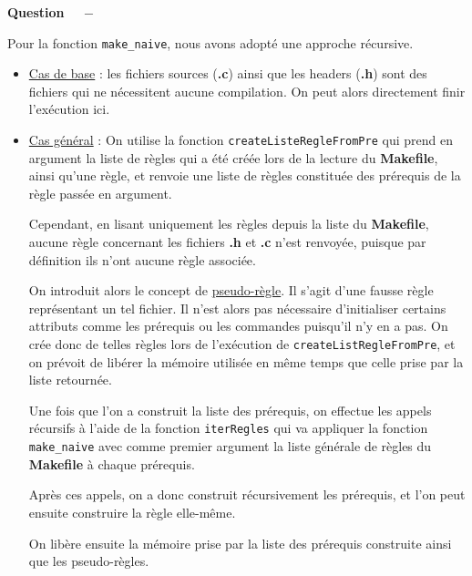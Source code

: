 \documentclass[11pt]{article}
\newcounter{question}[section]
\newenvironment{question}[1][]{\refstepcounter{question}\par\medskip
   \noindent\textbf{Question~\thequestion ~ $-$} \rmfamily}{}
\begin{document}
\begin{question} %

Pour la fonction \texttt{make\_naive}, nous avons adopté une approche récursive.
\begin{itemize}
	\item \underline{Cas de base} : les fichiers sources (\textbf{.c}) ainsi que les headers (\textbf{.h}) sont des fichiers qui ne nécessitent aucune compilation.
	On peut alors directement finir l'exécution ici.
	\item \underline{Cas général} : On utilise la fonction \texttt{createListeRegleFromPre} qui prend en argument la liste de règles qui a été créée lors de la lecture du \textbf{Makefile}, ainsi qu'une règle,
	et renvoie une liste de règles constituée des prérequis de la règle passée en argument.

	Cependant, en lisant uniquement les règles depuis la liste du \textbf{Makefile}, aucune règle concernant les fichiers \textbf{.h} et \textbf{.c} n'est renvoyée, puisque par définition ils n'ont aucune règle associée.

	On introduit alors le concept de \underline{pseudo-règle}. Il s'agit d'une fausse règle représentant un tel fichier. Il n'est alors pas nécessaire d'initialiser certains attributs comme les prérequis ou les commandes puisqu'il n'y en a pas.
	On crée donc de telles règles lors de l'exécution de \texttt{createListRegleFromPre}, et on prévoit de libérer la mémoire utilisée en même temps que celle prise par la liste retournée.

	Une fois que l'on a construit la liste des prérequis, on effectue les appels récursifs à l'aide de la fonction \texttt{iterRegles} qui va appliquer la fonction \texttt{make\_naive} avec comme premier argument la liste générale de règles du \textbf{Makefile} à chaque prérequis.

	Après ces appels, on a donc construit récursivement les prérequis, et l'on peut ensuite construire la règle elle-même.
	
	On libère ensuite la mémoire prise par la liste des prérequis construite ainsi que les pseudo-règles.
\end{itemize}
\end{question}
\end{document}
